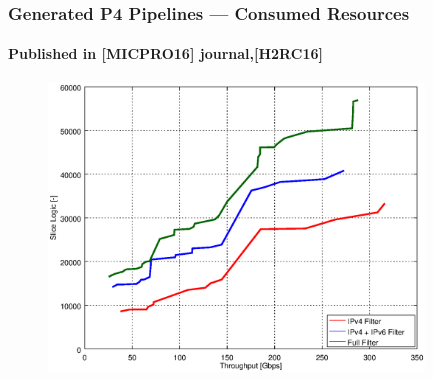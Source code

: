 \begin{frame}
    \frametitle{Generated P4 Pipelines --- Consumed Resources}
    \framesubtitle{Published in [MICPRO16] journal,[H2RC16]}
    
    \begin{figure}
        \centering
        \includegraphics[width=0.89\textwidth]{pic/graph/table/thr_slice_logic_pareto}
    \end{figure}
\end{frame}

